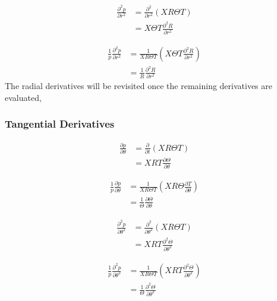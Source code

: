 \begin{align*}
    \frac{\partial^2 p}{\partial r^2} 
    &=
    \frac{\partial^2 }{\partial r^2}  \left( XR\Theta T \right) \\
    &=
    X\Theta T\frac{\partial^2 R}{\partial r^2}  
\end{align*}


\begin{align*}
    \frac{1}{p}\frac{\partial^2 p}{\partial r^2} 
    &=
    \frac{ 1}{X R \Theta T}  \left( X\Theta T \frac{\partial^2 R}{\partial r^2} \right) \\
    &=\frac{ 1}{ R}\frac{\partial^2 R}{\partial r^2}  
\end{align*}
The radial derivatives will be revisited once the remaining derivatives are evaluated,

\subsubsection{Tangential Derivatives}

\begin{align*}
    \frac{\partial p}{\partial \theta } 
    &=
    \frac{\partial }{\partial t}  \left( XR\Theta T \right) \\
    &=
    XRT\frac{\partial \Theta}{\partial \theta}  
\end{align*}


\begin{align*}
    \frac{1}{p}\frac{\partial p}{\partial \theta} 
    &=
    \frac{ 1}{X R \Theta T}  \left( XR\Theta\frac{\partial T}{\partial \theta} \right) \\
    &=\frac{ 1}{ \Theta}\frac{\partial \Theta}{\partial \theta}  
\end{align*}

\begin{align*}
    \frac{\partial^2 p}{\partial \theta^2} 
    &=
    \frac{\partial^2 }{\partial \theta^2}  \left( XR\Theta T \right) \\
    &=
    XRT\frac{\partial^2 \Theta }{\partial \theta^2}  
\end{align*}


\begin{align*}
    \frac{1}{p}\frac{\partial^2 p}{\partial \theta^2} 
    &=
    \frac{ 1}{X R \Theta T}  \left( XRT\frac{\partial^2 \Theta}{\partial \theta^2} \right) \\
    &=\frac{ 1}{ \Theta}\frac{\partial^2 \Theta}{\partial \theta^2}  
\end{align*}

